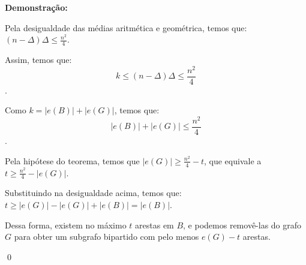 \documentclass[12pt]{article}
\newenvironment{sol}
    {\textbf{Demonstração:}\emph{}
    }
    {
    \qed
    }
\begin{document}
\begin{sol}
    Pela desigualdade das médias aritmética e geométrica, temos que:
    $(n-\Delta)\Delta \leq \frac{n^2}{4}$.

    Assim, temos que:
    $$k \leq (n-\Delta)\Delta \leq \frac{n^2}{4}$$.

    Como $k=|e(B)| + |e(G)|$, temos que:
    $$|e(B)| + |e(G)| \leq \frac{n^2}{4}$$.

    Pela hipótese do teorema, temos que $|e(G)| \geq \frac{n^2}{4}-t$,
    que equivale a $t \geq \frac{n^2}{4} - |e(G)|$.

    Substituindo na desigualdade acima, temos que:
    $t \geq |e(G)| - |e(G)| + |e(B)| = |e(B)|$. 

    Dessa forma, existem no máximo $t$ arestas em $B$,
    e podemos removê-las do grafo $G$ para obter um subgrafo bipartido com pelo menos
    $e(G)-t$ arestas.

\end{sol}
\end{document}
